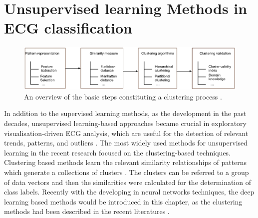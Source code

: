 \documentclass[graybox]{svmult}
\begin{document}

\section{Unsupervised learning Methods in ECG classification}
%
\begin{figure}[]
\sidecaption
\includegraphics[scale=.32]{clustering}
%
%
\caption{An overview of the basic steps constituting a clustering process \citep{clifford2006advanced}.}
\label{fig:2}       %
\end{figure}

In addition to the supervised learning methods, as the development in the past decades, unsupervised learning-based approaches became crucial in exploratory visualisation-driven ECG analysis, which are useful for the detection of relevant trends, patterns, and outliers \citep[e.g.][]{silipo1996supervised, lagerholm2000clustering}. 
The most widely used methods for unsupervised learning in the recent research focused on the clustering-based techniques. Clustering based methods learn the relevant similarity relationships of patterns which generate a collections of clusters \citep{bezdek1998some}. The clusters can be referred to a group of data vectors and then the similarities were calculated for the determination of class labels. Recently with the developing in neural networks techniques, the deep learning based methods would be introduced in this chapter, as the clustering methods had been described in the recent literatures \citep[e.g.][]{yeh2012analyzing, rodriguez2012unsupervised}.







\end{document}
